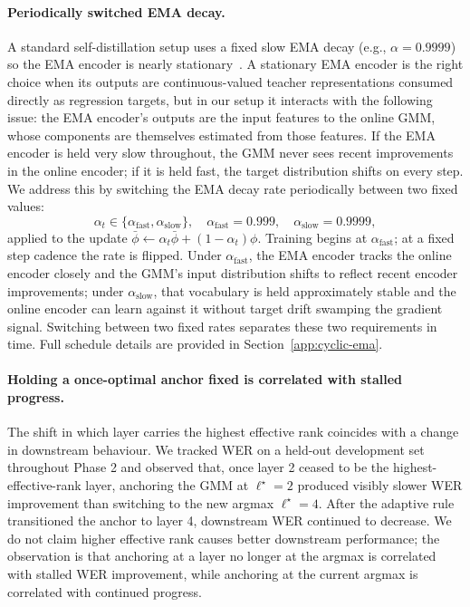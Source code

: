 \documentclass[9pt,twocolumn]{article}
\theoremstyle{plain}
\theoremstyle{definition}
\theoremstyle{remark}
\begin{document}
\paragraph{Periodically switched EMA decay.} \label{par:cyclic-ema} A standard self-distillation setup uses a fixed slow EMA decay (e.g., $\alpha = 0.9999$) so the EMA encoder is nearly stationary~\citep{grill2020byol,baevski2022data2vec}. A stationary EMA encoder is the right choice when its outputs are continuous-valued teacher representations consumed directly as regression targets, but in our setup it interacts with the following issue: the EMA encoder's outputs are the input features to the online GMM, whose components are themselves estimated from those features. If the EMA encoder is held very slow throughout, the GMM never sees recent improvements in the online encoder; if it is held fast, the target distribution shifts on every step. We address this by switching the EMA decay rate periodically between two fixed values:
\begin{equation}
\alpha_t \in \{\alpha_{\text{fast}}, \alpha_{\text{slow}}\}, \quad \alpha_{\text{fast}} = 0.999, \quad \alpha_{\text{slow}} = 0.9999,
\label{eq:ema_switch}
\end{equation}
applied to the update $\bar{\phi} \leftarrow \alpha_t \bar{\phi} + (1 - \alpha_t)\phi$. Training begins at $\alpha_{\text{fast}}$; at a fixed step cadence the rate is flipped. Under $\alpha_{\text{fast}}$, the EMA encoder tracks the online encoder closely and the GMM's input distribution shifts to reflect recent encoder improvements; under $\alpha_{\text{slow}}$, that vocabulary is held approximately stable and the online encoder can learn against it without target drift swamping the gradient signal. Switching between two fixed rates separates these two requirements in time. Full schedule details are provided in Section~\ref{app:cyclic-ema}.


\iffalse
\paragraph{Holding a once-optimal anchor fixed is correlated with stalled progress.}
The shift in which layer carries the highest effective rank coincides with a change in downstream behaviour. We tracked WER on a held-out development set throughout Phase 2 and observed that, once layer 2 ceased to be the highest-effective-rank layer, anchoring the GMM at $\ell^\star\!=\!2$ produced visibly slower WER improvement than switching to the new argmax $\ell^\star\!=\!4$. After the adaptive rule transitioned the anchor to layer 4, downstream WER continued to decrease. We do not claim higher effective rank causes better downstream performance; the observation is that anchoring at a layer no longer at the argmax is correlated with stalled WER improvement, while anchoring at the current argmax is correlated with continued progress.
\end{document}
